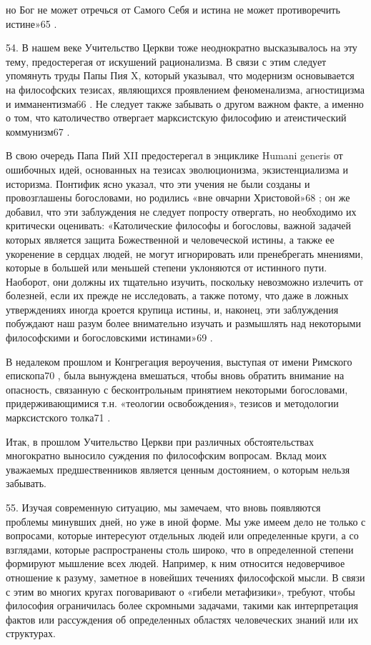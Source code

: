 \documentclass[a5paper,10pt]{article}
\begin{document}
но Бог не может отречься от Самого Себя и истина не может противоречить
истине»65 .

54. В нашем веке Учительство Церкви тоже неоднократно высказывалось на эту
тему, предостерегая от искушений рационализма. В связи с этим следует упомянуть
труды Папы Пия X, который указывал, что модернизм основывается на философских
тезисах, являющихся проявлением феноменализма, агностицизма и имманентизма66 .
Не следует также забывать о другом важном факте, а именно о том, что
католичество отвергает марксистскую философию и атеистический коммунизм67 .

В свою очередь Папа Пий XII предостерегал в энциклике Humani generis от
ошибочных идей, основанных на тезисах эволюционизма, экзистенциализма и
историзма. Понтифик ясно указал, что эти учения не были созданы и провозглашены
богословами, но родились «вне овчарни Христовой»68 ; он же добавил, что эти
заблуждения не следует попросту отвергать, но необходимо их критически
оценивать: «Католические философы и богословы, важной задачей которых является
защита Божественной и человеческой истины, а также ее укоренение в сердцах
людей, не могут игнорировать или пренебрегать мнениями, которые в большей или
меньшей степени уклоняются от истинного пути. Наоборот, они должны их тщательно
изучить, поскольку невозможно излечить от болезней, если их прежде не
исследовать, а также потому, что даже в ложных утверждениях иногда кроется
крупица истины, и, наконец, эти заблуждения побуждают наш разум более
внимательно изучать и размышлять над некоторыми философскими и богословскими
истинами»69 .

В недалеком прошлом и Конгрегация вероучения, выступая от имени Римского
епископа70 , была вынуждена вмешаться, чтобы вновь обратить внимание на
опасность, связанную с бесконтрольным принятием некоторыми богословами,
придерживающимися т.н. «теологии освобождения», тезисов и методологии
марксистского толка71 .

Итак, в прошлом Учительство Церкви при различных обстоятельствах многократно
выносило суждения по философским вопросам. Вклад моих уважаемых
предшественников является ценным достоянием, о которым нельзя забывать.

55. Изучая современную ситуацию, мы замечаем, что вновь появляются проблемы
минувших дней, но уже в иной форме. Мы уже имеем дело не только с вопросами,
которые интересуют отдельных людей или определенные круги, а со взглядами,
которые распространены столь широко, что в определенной степени формируют
мышление всех людей. Например, к ним относится недоверчивое отношение к разуму,
заметное в новейших течениях философской мысли. В связи с этим во многих кругах
поговаривают о «гибели метафизики», требуют, чтобы философия ограничилась более
скромными задачами, такими как интерпретация фактов или рассуждения об
определенных областях человеческих знаний или их структурах.
\end{document}

